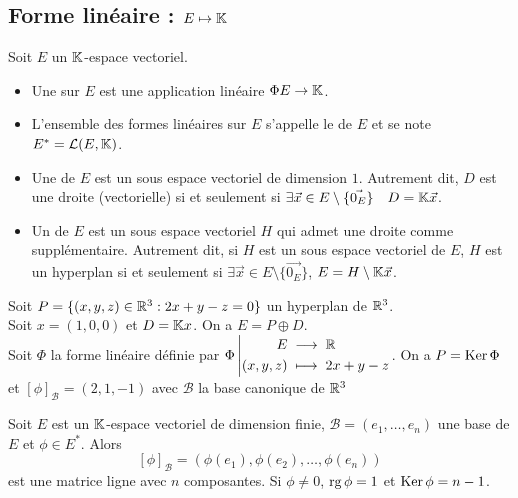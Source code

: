 \documentclass{book}
\begin{document}
\subsection{Forme linéaire : $E\mapsto \mathbb{K} $}
\begin{Definition}

Soit $E$ un $\mathbb{K} $-espace vectoriel.
\begin{itemize}
\item
  Une  sur $E$ est une application linéaire $\Phi E\to \mathbb{K} $.
\item  L'ensemble des formes linéaires sur $E$ s'appelle le  de $E$  et se note $E^* = \mathcal{L}(E,\mathbb{K} )$.
\item
  Une  de $E$ est un sous espace vectoriel de dimension $1$.
  Autrement dit, $D$ est une droite (vectorielle) si et seulement si $\exists  \vec{x}\in  E\setminus \{\vec{0_E}\} \quad D =\mathbb{K} \vec{x}$.
\item
  Un  de $E$ est un sous espace vectoriel $H$
  qui admet une droite comme supplémentaire.
  Autrement dit, si $H$ est un sous espace vectoriel de $E$,
  $H$ est un hyperplan si et seulement si  $\exists  \vec{x}\in  E\setminus \{\vec{0_E}\}$, $E = H\setminus \mathbb{K} \vec{x}$.
\end{itemize}
\end{Definition}
\begin{Exemple}
Soit $P = \{(x,y,z)\in  \mathbb{R} ^3:2x+y-z=0\}$ un hyperplan de $\mathbb{R}^3$.\\
Soit $x = (1,0,0)$ et $D = \mathbb{K} x$. On a $E = P \oplus D$.\\
Soit $\Phi$ la forme linéaire définie par $ {\Phi }\left|\begin{aligned}{E}&\;\longrightarrow\;{\mathbb{R} }\\{(x,y,z)}&\;\longmapsto\;{2x+y-z}\end{aligned}\right.$. On a $P = \operatorname{Ker} \Phi $ et $[\phi]_{\mathcal{B}}=(2,1,-1)$ avec $\mathcal{B}$ la base canonique de $\mathbb{R} ^3$
\end{Exemple}
\begin{Proposition} 
Soit $E$ est un $\mathbb{K} $-espace vectoriel de dimension finie, $\mathcal{B}=(e_1,\dots,e_n)$ une base de $E$ et $\phi\in E^*$. Alors   $$[\phi]_{\mathcal{B}}=(\phi(e_1),\phi(e_2),\dots,\phi(e_n))$$ est une matrice ligne avec $n$ composantes. Si $\phi\neq 0$, $\operatorname{rg} \phi =1$ et $\operatorname{Ker} \phi =n-1$.
\end{Proposition}
\end{document}
